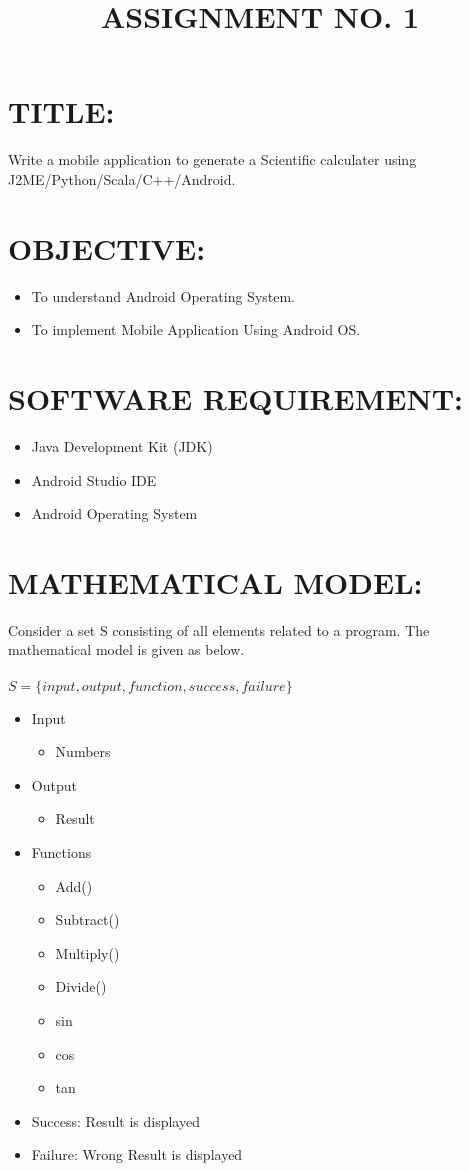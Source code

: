\documentclass[11pt]{article}
\title{
	\huge ASSIGNMENT NO. 1
}
\date{\normalsize}
\begin{document}
\maketitle
\section{TITLE:} Write a mobile application to generate a Scientific calculater using J2ME/Python/Scala/C++/Android.
\section{OBJECTIVE:} 
	\begin{itemize}
		\item To understand Android Operating System. 
		\item To implement Mobile Application Using Android OS.
	\end{itemize}
\section{SOFTWARE REQUIREMENT:}
	\begin{itemize}
		\item Java Development Kit (JDK) 
		\item Android Studio IDE 
		\item Android Operating System
	\end{itemize}
\section{MATHEMATICAL MODEL:}
	Consider a set S consisting of all elements related to a program. 
	The mathematical model is given as below.  \\  \\
    $S=\{input,output,function,success,failure\}$
	\begin{itemize}
		\item Input
			\begin{itemize}
				\item Numbers
			\end{itemize} 
		\item Output
			\begin{itemize}
				\item Result
			\end{itemize} 
		\item Functions
			\begin{itemize}
				\item Add()
				\item Subtract()
				\item Multiply()
				\item Divide()
				\item sin
				\item cos
				\item tan
			\end{itemize} 
		\item Success: Result is displayed
		\item Failure: Wrong Result is displayed
	\end{itemize} 
\end{document}
